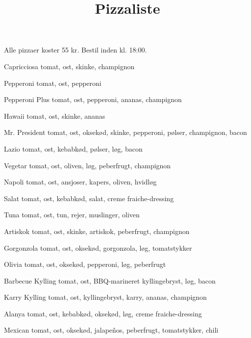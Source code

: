 

\title{Pizzaliste}
\date{}

\usepackage[marginparwidth = 10pt]{geometry}


\maketitle


Alle pizzaer koster 55 kr. Bestil inden kl. 18:00.

\begin{multicols}{2}
  \begin{enumdescription}
  \item[Capricciosa] tomat, ost, skinke, champignon
  \item[Pepperoni] tomat, ost, pepperoni
  \item[Pepperoni Plus] tomat, ost, pepperoni, ananas, champignon
  \item[Hawaii] tomat, ost, skinke, ananas
  \item[Mr. President] tomat, ost, oksekød, skinke, pepperoni, pølser,
    champignon, bacon
  \item[Lazio] tomat, ost, kebabkød, pølser, løg, bacon
  \item[Vegetar] tomat, ost, oliven, løg, peberfrugt, champignon
  \item[Napoli] tomat, ost, ansjoser, kapers, oliven, hvidløg
  \item[Salat] tomat, ost, kebabkød, salat, creme fraiche-dressing
  \item[Tuna] tomat, ost, tun, rejer, muslinger, oliven
  \item[Artiskok] tomat, ost, skinke, artiskok, peberfrugt, champignon
  \item[Gorgonzola] tomat, ost, oksekød, gorgonzola, løg, tomatstykker
  \item[Olivia] tomat, ost, oksekød, pepperoni, løg, peberfrugt
  \item[Barbecue Kylling] tomat, ost, BBQ-marineret kyllingebryst,
    løg, bacon
  \item[Karry Kylling] tomat, ost, kyllingebryst, karry, ananas,
    champignon
  \item[Alanya] tomat, ost, kebabkød, oksekød, løg, creme fraiche-dressing
  \item[Mexican] tomat, ost, oksekød, jalapeños, peberfrugt,
    tomatstykker, chili

\end{enumdescription}
\end{multicols}
